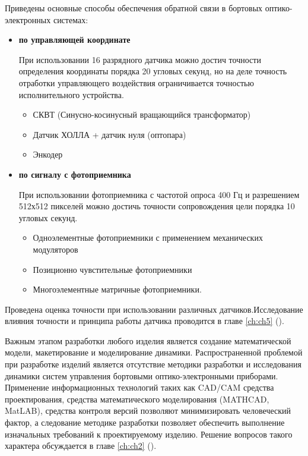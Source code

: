 Приведены основные способы обеспечения обратной связи в бортовых оптико-электронных системах:
\begin{itemize}
	\item \textbf{по управляющей координате}
	
	При использовании 16 разрядного датчика можно достич точности определения координаты порядка 20 угловых секунд, но на деле точность отработки управляющего воздействия ограничивается точностью исполнительного устройства.
	
	\begin{itemize}
		\item СКВТ (Синусно-косинусный вращающийся трансформатор)
		\item Датчик ХОЛЛА + датчик нуля (оптопара)
		\item Энкодер
	\end{itemize}
		
	\item \textbf{по сигналу с фотоприемника} 
	
	При использовании фотоприемника с частотой опроса 400 Гц и разрешением 512х512 пикселей можно достичь точности сопровождения цели порядка 10 угловых секунд.
	
	\begin{itemize}
		\item Одноэлементные фотоприемники с применением механических модуляторов
		\item Позиционно чувстительные фотоприемники		
		\item Многоэлементные матричные фотоприемники.	
	\end{itemize}
	
	
\end{itemize}
Проведена оценка точности при использовании различных датчиков.Исследование влияния точности и принципа работы датчика проводится в главе \ref{ch:ch5} ().

Важным этапом разработки любого изделия является создание математической модели, макетирование и моделирование динамики. Распространенной проблемой при разработке изделий является отсутствие методики разработки и исследования динамики систем управления бортовыми оптико-электронными приборами. Применение информационных технологий таких как CAD/CAM средства проектирования, средства математического моделирования (MATHCAD, MatLAB), средства контроля версий позволяют минимизировать человеческий фактор, а следование методике разработки позволяет обеспечить выполнение изначальных требований к проектируемому изделию. Решение вопросов такого характера обсуждается в главе \ref{ch:ch2} ().

\clearpage